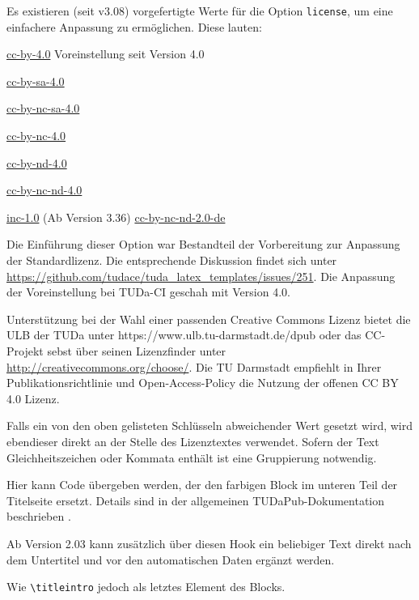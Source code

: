 \documentclass[
	german,%
	accentcolor=9c,%
	ruledheaders=section,%
	class=report,%
	thesis={type=bachelor},%
	fontsize=11pt,%
	parskip=half-,%
	custommargins=true,%
	marginpar=false,%
]{tudapub}
\newcommand*{\code}[1]{\texttt{#1}}
\let\tbs\textbackslash
\begin{document}
\begin{description}
	      Es existieren (seit v3.08) vorgefertigte Werte für die Option \verb|license|, um eine einfachere Anpassung zu ermöglichen. Diese lauten:

	      \parbox[t]{.5\linewidth}{%
		      \ttfamily
		      \href{https://creativecommons.org/licenses/by/4.0/}{cc-by-4.0} \textnormal{Voreinstellung seit Version 4.0}\par
		      \href{https://creativecommons.org/licenses/by-sa/4.0/}{cc-by-sa-4.0}\par
		      \href{https://creativecommons.org/licenses/by-nc-sa/4.0/}{cc-by-nc-sa-4.0}\par
		      \href{https://creativecommons.org/licenses/by-nc-/4.0/}{cc-by-nc-4.0}\par
	      }%
	      \parbox[t]{.5\linewidth}{
		      \ttfamily
		      \href{https://creativecommons.org/licenses/by-nd/4.0/}{cc-by-nd-4.0}\par
		      \href{https://creativecommons.org/licenses/by-nc-nd/4.0/}{cc-by-nc-nd-4.0}\par
		      \href{https://rightsstatements.org/page/InC/1.0/}{inc-1.0}\textnormal{ (Ab Version 3.36)}
		      \href{https://creativecommons.org/licenses/by-nc-nd/2.0/}{cc-by-nc-nd-2.0-de}\par
	      }

	      Die Einführung dieser Option war Bestandteil der Vorbereitung zur Anpassung der Standardlizenz.
	      Die entsprechende Diskussion findet sich unter \url{https://github.com/tudace/tuda_latex_templates/issues/251}. Die Anpassung der Voreinstellung bei TUDa-CI geschah mit Version 4.0.

	      Unterstützung bei der Wahl einer passenden Creative Commons Lizenz bietet die ULB der TUDa unter https://www.ulb.tu-darmstadt.de/dpub  oder  das CC-Projekt sebst über seinen Lizenzfinder unter \url{http://creativecommons.org/choose/}.
	      Die TU Darmstadt empfiehlt in Ihrer Publikationsrichtlinie und Open-Access-Policy die Nutzung der offenen CC BY 4.0 Lizenz.

	      Falls ein von den oben gelisteten Schlüsseln abweichender Wert gesetzt wird, wird ebendieser direkt an der Stelle des Lizenztextes verwendet. Sofern der Text Gleichheitszeichen oder Kommata enthält ist eine Gruppierung notwendig.
	\item[titlegraphic] Hier kann Code übergeben werden, der den farbigen Block im unteren Teil der Titelseite ersetzt. Details sind in der allgemeinen TUDaPub-Dokumentation beschrieben \cite{tuda-ci}.
	\item[titleintro] Ab Version 2.03 kann zusätzlich über diesen Hook ein beliebiger Text direkt nach dem Untertitel und vor den automatischen Daten ergänzt werden.
	\item[titleaddendum] Wie \code{\tbs{}titleintro} jedoch als letztes Element des Blocks.
\end{description}
\end{document}
